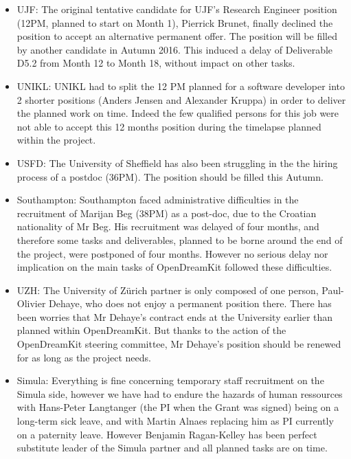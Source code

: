 \documentclass{deliverablereport}
\begin{document}
\begin{itemize}
\item{UJF:} The original tentative candidate for UJF's Research
  Engineer position (12PM, planned to start on Month 1), Pierrick
  Brunet, finally declined the position to accept an alternative
  permanent offer. The position will be filled by another candidate in
  Autumn 2016. This induced a delay of Deliverable D5.2 from Month 12
  to Month 18, without impact on other tasks.\\

\item{UNIKL:} UNIKL had to split the 12 PM planned for a software developer into 2 shorter positions (Anders Jensen and Alexander Kruppa) in order to deliver the planned work on time. Indeed the few qualified persons for this job were not able to accept this 12 months position during the timelapse planned within the project.\\

\item{USFD:} The University of Sheffield has also been struggling in the the hiring process of a postdoc (36PM). The position should be filled this Autumn.\\

\item{Southampton:} Southampton faced administrative difficulties in the recruitment of Marijan Beg (38PM) as a post-doc, due to the Croatian nationality of Mr Beg. His recruitment was delayed of four months, and therefore some tasks and deliverables, planned to be borne around the end of the project, were postponed of four months. However no serious delay nor implication on the main tasks of OpenDreamKit followed these difficulties.

\item{UZH:} The University of Zürich partner is only composed of one person, Paul-Olivier Dehaye, who does not enjoy a permanent position there. There has been worries that Mr Dehaye's contract ends at the University earlier than planned within OpenDreamKit. But thanks to the action of the OpenDreamKit steering committee, Mr Dehaye's position should be renewed for as long as the project needs.\\

\item{Simula:} Everything is fine concerning temporary staff recruitment on the Simula side, however we have had to endure the hazards of human ressources with Hans-Peter Langtanger (the PI when the Grant was signed) being on a long-term sick leave, and with Martin Alnaes replacing him as PI currently on a paternity leave. However Benjamin Ragan-Kelley has been perfect  substitute leader of the Simula partner and all planned tasks are on time.\\
\end{itemize}
\end{document}

